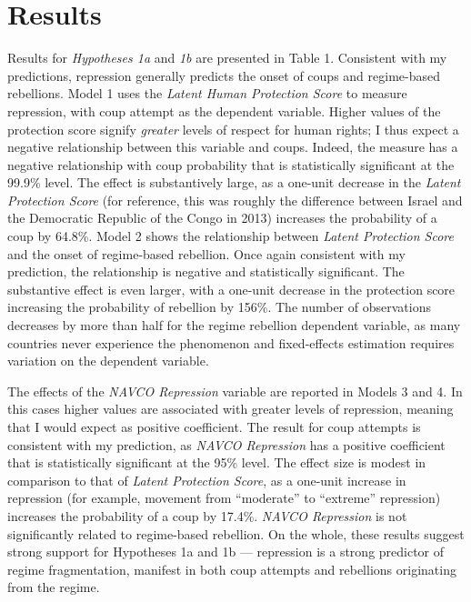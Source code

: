 \documentclass[12pt,]{article}
\theoremstyle{definition}
\theoremstyle{definition}
\theoremstyle{definition}
\theoremstyle{remark}
\begin{document}
\hypertarget{results}{%
\section{Results}\label{results}}

Results for \emph{Hypotheses 1a} and \emph{1b} are presented in Table 1.
Consistent with my predictions, repression generally predicts the onset
of coups and regime-based rebellions. Model 1 uses the \emph{Latent
Human Protection Score} to measure repression, with coup attempt as the
dependent variable. Higher values of the protection score signify
\emph{greater} levels of respect for human rights; I thus expect a
negative relationship between this variable and coups. Indeed, the
measure has a negative relationship with coup probability that is
statistically significant at the 99.9\% level. The effect is
substantively large, as a one-unit decrease in the \emph{Latent
Protection Score} (for reference, this was roughly the difference
between Israel and the Democratic Republic of the Congo in 2013)
increases the probability of a coup by 64.8\%. Model 2 shows the
relationship between \emph{Latent Protection Score} and the onset of
regime-based rebellion. Once again consistent with my prediction, the
relationship is negative and statistically significant. The substantive
effect is even larger, with a one-unit decrease in the protection score
increasing the probability of rebellion by 156\%. The number of
observations decreases by more than half for the regime rebellion
dependent variable, as many countries never experience the phenomenon
and fixed-effects estimation requires variation on the dependent
variable.

The effects of the \emph{NAVCO Repression} variable are reported in
Models 3 and 4. In this cases higher values are associated with greater
levels of repression, meaning that I would expect as positive
coefficient. The result for coup attempts is consistent with my
prediction, as \emph{NAVCO Repression} has a positive coefficient that
is statistically significant at the 95\% level. The effect size is
modest in comparison to that of \emph{Latent Protection Score}, as a
one-unit increase in repression (for example, movement from ``moderate''
to ``extreme'' repression) increases the probability of a coup by
17.4\%. \emph{NAVCO Repression} is not significantly related to
regime-based rebellion. On the whole, these results suggest strong
support for Hypotheses 1a and 1b --- repression is a strong predictor of
regime fragmentation, manifest in both coup attempts and rebellions
originating from the regime.
\end{document}
